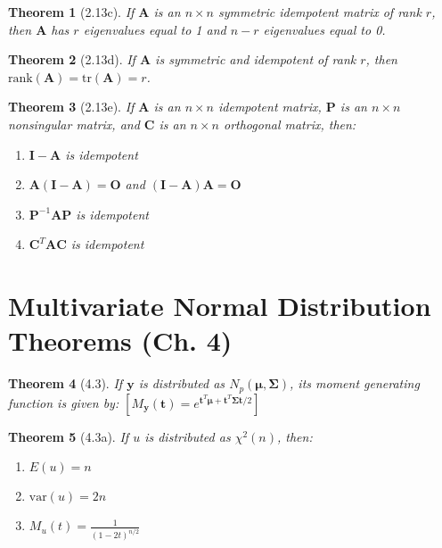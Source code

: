 \documentclass{article}
\newtheorem{theorem}{Theorem}[section]
\begin{document}
\begin{theorem}[2.13c]
If $\mathbf{A}$ is an $n \times n$ symmetric idempotent matrix of rank $r$, then $\mathbf{A}$ has $r$ eigenvalues equal to 1 and $n-r$ eigenvalues equal to 0.
\end{theorem}

\begin{theorem}[2.13d]
If $\mathbf{A}$ is symmetric and idempotent of rank $r$, then $\text{rank}(\mathbf{A}) = \text{tr}(\mathbf{A}) = r$.
\end{theorem}

\begin{theorem}[2.13e]
If $\mathbf{A}$ is an $n \times n$ idempotent matrix, $\mathbf{P}$ is an $n \times n$ nonsingular matrix, and $\mathbf{C}$ is an $n \times n$ orthogonal matrix, then:
\begin{enumerate}[label=(\roman*)]
\item $\mathbf{I} - \mathbf{A}$ is idempotent
\item $\mathbf{A}(\mathbf{I}-\mathbf{A}) = \mathbf{O}$ and $(\mathbf{I}-\mathbf{A})\mathbf{A} = \mathbf{O}$
\item $\mathbf{P}^{-1}\mathbf{A}\mathbf{P}$ is idempotent
\item $\mathbf{C}^T\mathbf{A}\mathbf{C}$ is idempotent
\end{enumerate}
\end{theorem}

\section{Multivariate Normal Distribution Theorems (Ch. 4)}

\begin{theorem}[4.3]
If $\mathbf{y}$ is distributed as $N_p(\boldsymbol{\mu}, \boldsymbol{\Sigma})$, its moment generating function is given by:
$[M_{\mathbf{y}}(\mathbf{t}) = e^{\mathbf{t}^T\boldsymbol{\mu} + \mathbf{t}^T\boldsymbol{\Sigma}\mathbf{t}/2}]$
\end{theorem}

\begin{theorem}[4.3a]
If $u$ is distributed as $\chi^2(n)$, then:
\begin{enumerate}
    \item $E(u) = n$
    \item $\text{var}(u) = 2n$
    \item $M_u(t) = \frac{1}{(1-2t)^{n/2}}$
\end{enumerate}
\end{theorem}
\end{document}
